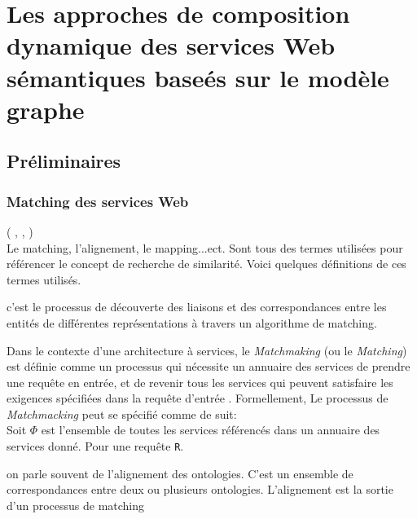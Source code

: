 \chapter{Les approches de composition dynamique des services Web sémantiques baseés sur le modèle graphe}
\newpage
\section{Préliminaires}
  \subsection{Matching des services Web}
  \label{sec:match-des-serv}
  ( \cite{lecue2006formal}, \cite{paolucci2002semantic},
  \cite{li2004software})\\
  Le matching, l'alignement, le mapping...ect. Sont tous des termes
  utilisées pour référencer le concept de recherche de
  similarité. Voici quelques définitions de ces termes utilisés.

  \begin{mydef}[Matching]
    c'est le processus de découverte des liaisons et des
    correspondances entre les entités de différentes représentations à
    travers un algorithme de matching.
  \end{mydef}


  Dans le contexte d'une architecture à services, le
  \textit{Matchmaking} (ou le \textit{Matching}) est définie comme un
  processus qui nécessite un annuaire des services de prendre une
  requête en entrée, et de revenir tous les services qui peuvent
  satisfaire les exigences spécifiées dans la requête d'entrée
  \cite{li2004software}. Formellement, Le processus de
  \textit{Matchmacking} peut se spécifié comme de suit:\\

  Soit $\Phi$ est l'ensemble de toutes les services référencés dans un
  annuaire des services donné. Pour une requête \verb|R|.

  \begin{mydef}[Alignement]
    on parle souvent de l'alignement des ontologies. C'est un ensemble
    de correspondances entre deux ou plusieurs
    ontologies. L'alignement est la sortie d’un processus de matching
  \end{mydef}

